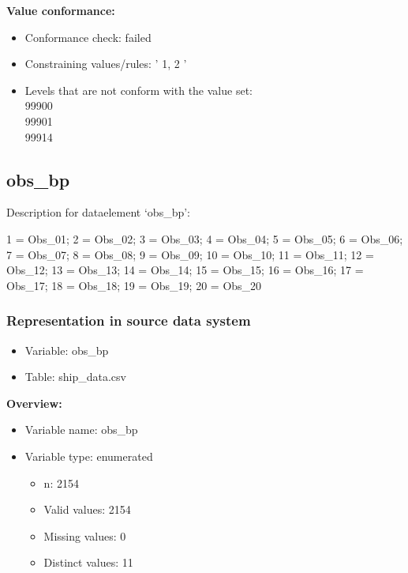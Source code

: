\documentclass[
]{article}
\providecommand{\tightlist}{%
  \setlength{\itemsep}{0pt}\setlength{\parskip}{0pt}}
\begin{document}
\textbf{Value conformance:}

\begin{itemize}
\tightlist
\item
  Conformance check: failed
\item
  Constraining values/rules: ' 1, 2 '
\item
  Levels that are not conform with the value set:\\
  99900\\
  99901\\
  99914
\end{itemize}

\newpage

\hypertarget{obs_bp}{%
\subsection{obs\_bp}\label{obs_bp}}

Description for dataelement `obs\_bp':

1 = Obs\_01; 2 = Obs\_02; 3 = Obs\_03; 4 = Obs\_04; 5 = Obs\_05; 6 =
Obs\_06; 7 = Obs\_07; 8 = Obs\_08; 9 = Obs\_09; 10 = Obs\_10; 11 =
Obs\_11; 12 = Obs\_12; 13 = Obs\_13; 14 = Obs\_14; 15 = Obs\_15; 16 =
Obs\_16; 17 = Obs\_17; 18 = Obs\_18; 19 = Obs\_19; 20 = Obs\_20

\hypertarget{representation-in-source-data-system-18}{%
\subsubsection{\texorpdfstring{Representation in \textbf{source} data
system}{Representation in source data system}}\label{representation-in-source-data-system-18}}

\begin{itemize}
\tightlist
\item
  Variable: obs\_bp
\item
  Table: ship\_data.csv
\end{itemize}

\textbf{Overview:}

\begin{itemize}
\tightlist
\item
  Variable name: obs\_bp
\item
  Variable type: enumerated

  \begin{itemize}
  \tightlist
  \item
    n: 2154
  \item
    Valid values: 2154
  \item
    Missing values: 0
  \item
    Distinct values: 11
  \end{itemize}
\end{itemize}
\end{document}

